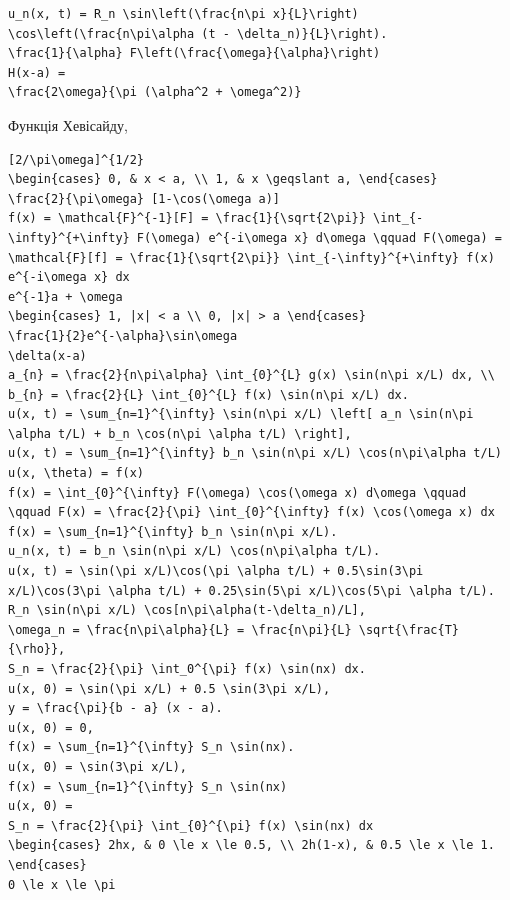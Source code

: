 \documentclass[
  ukrainian,
]{article}
\begin{document}
\begin{verbatim}
u_n(x, t) = R_n \sin\left(\frac{n\pi x}{L}\right) \cos\left(\frac{n\pi\alpha (t - \delta_n)}{L}\right).
\frac{1}{\alpha} F\left(\frac{\omega}{\alpha}\right)
H(x-a) =
\frac{2\omega}{\pi (\alpha^2 + \omega^2)}
\end{verbatim}

Функція Хевісайду,

\begin{verbatim}
[2/\pi\omega]^{1/2}
\begin{cases} 0, & x < a, \\ 1, & x \geqslant a, \end{cases}
\frac{2}{\pi\omega} [1-\cos(\omega a)]
f(x) = \mathcal{F}^{-1}[F] = \frac{1}{\sqrt{2\pi}} \int_{-\infty}^{+\infty} F(\omega) e^{-i\omega x} d\omega \qquad F(\omega) = \mathcal{F}[f] = \frac{1}{\sqrt{2\pi}} \int_{-\infty}^{+\infty} f(x) e^{-i\omega x} dx
e^{-1}a + \omega
\begin{cases} 1, |x| < a \\ 0, |x| > a \end{cases}
\frac{1}{2}e^{-\alpha}\sin\omega
\delta(x-a)
a_{n} = \frac{2}{n\pi\alpha} \int_{0}^{L} g(x) \sin(n\pi x/L) dx, \\ b_{n} = \frac{2}{L} \int_{0}^{L} f(x) \sin(n\pi x/L) dx.
u(x, t) = \sum_{n=1}^{\infty} \sin(n\pi x/L) \left[ a_n \sin(n\pi \alpha t/L) + b_n \cos(n\pi \alpha t/L) \right],
u(x, t) = \sum_{n=1}^{\infty} b_n \sin(n\pi x/L) \cos(n\pi\alpha t/L)
u(x, \theta) = f(x)
f(x) = \int_{0}^{\infty} F(\omega) \cos(\omega x) d\omega \qquad \qquad F(x) = \frac{2}{\pi} \int_{0}^{\infty} f(x) \cos(\omega x) dx
f(x) = \sum_{n=1}^{\infty} b_n \sin(n\pi x/L).
u_n(x, t) = b_n \sin(n\pi x/L) \cos(n\pi\alpha t/L).
u(x, t) = \sin(\pi x/L)\cos(\pi \alpha t/L) + 0.5\sin(3\pi x/L)\cos(3\pi \alpha t/L) + 0.25\sin(5\pi x/L)\cos(5\pi \alpha t/L).
R_n \sin(n\pi x/L) \cos[n\pi\alpha(t-\delta_n)/L],
\omega_n = \frac{n\pi\alpha}{L} = \frac{n\pi}{L} \sqrt{\frac{T}{\rho}},
S_n = \frac{2}{\pi} \int_0^{\pi} f(x) \sin(nx) dx.
u(x, 0) = \sin(\pi x/L) + 0.5 \sin(3\pi x/L),
y = \frac{\pi}{b - a} (x - a).
u(x, 0) = 0,
f(x) = \sum_{n=1}^{\infty} S_n \sin(nx).
u(x, 0) = \sin(3\pi x/L),
f(x) = \sum_{n=1}^{\infty} S_n \sin(nx)
u(x, 0) =
S_n = \frac{2}{\pi} \int_{0}^{\pi} f(x) \sin(nx) dx
\begin{cases} 2hx, & 0 \le x \le 0.5, \\ 2h(1-x), & 0.5 \le x \le 1. \end{cases}
0 \le x \le \pi
\end{verbatim}
\end{document}
